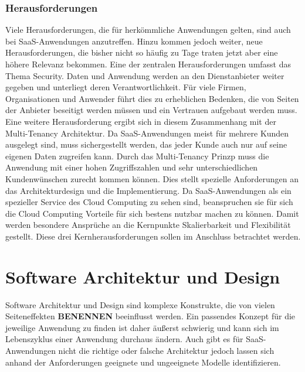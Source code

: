 \subsection{Herausforderungen}
Viele Herausforderungen, die für herkömmliche Anwendungen gelten, sind auch bei SaaS-Anwendungen anzutreffen. Hinzu kommen jedoch weiter, neue Herausforderungen, die bisher nicht so häufig zu Tage traten jetzt aber eine höhere Relevanz bekommen. Eine der zentralen Herausforderungen umfasst das Thema Security. Daten und Anwendung werden an den Dienstanbieter weiter gegeben und unterliegt deren Verantwortlichkeit. Für viele Firmen, Organisationen und Anwender führt dies zu erheblichen Bedenken, die von Seiten der Anbieter beseitigt werden müssen und ein Vertrauen aufgebaut werden muss. Eine weitere Herausforderung ergibt sich in diesem Zusammenhang mit der Multi-Tenancy Architektur. Da SaaS-Anwendungen meist für mehrere Kunden ausgelegt sind, muss sichergestellt werden, das jeder Kunde auch nur auf seine eigenen Daten zugreifen kann. Durch das Multi-Tenancy Prinzp muss die Anwendung mit einer hohen Zugriffszahlen und sehr unterschiedlichen Kundenwünschen zurecht kommen können. Dies stellt spezielle Anforderungen an das Architekturdesign und die Implementierung. Da SaaS-Anwendungen als ein spezieller Service des Cloud Computing zu sehen sind, beanspruchen sie für sich die Cloud Computing Vorteile für sich bestens nutzbar machen zu können. Damit werden besondere Ansprüche an die Kernpunkte Skalierbarkeit und Flexibilität gestellt. Diese drei Kernherausforderungen sollen im Anschluss betrachtet werden.

\clearpage
\chapter{Software Architektur und Design}
Software Architektur und Design sind komplexe Konstrukte, die von vielen Seiteneffekten \textbf{BENENNEN} beeinflusst werden. Ein passendes Konzept für die jeweilige Anwendung zu finden ist daher äußerst schwierig und kann sich im Lebenszyklus einer Anwendung durchaus ändern. Auch gibt es für SaaS-Anwendungen nicht die richtige oder falsche Architektur jedoch lassen sich anhand der Anforderungen geeignete und ungeeignete Modelle identifizieren.


